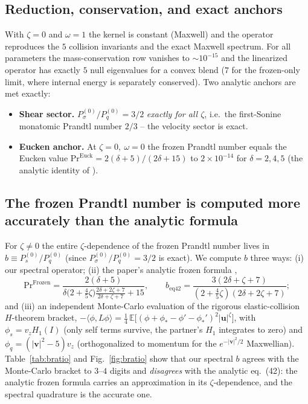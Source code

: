 \documentclass[11pt]{article}
\newcommand{\uu}{\mathbf{u}}
\newcommand{\vv}{\mathbf{v}}
\renewcommand{\Pr}{\mathrm{Pr}}
\begin{document}
\subsection{Reduction, conservation, and exact anchors}
With $\zeta=0$ and $\omega=1$ the kernel is constant (Maxwell) and the operator reproduces the
$5$ collision invariants and the exact Maxwell spectrum. For all parameters the mass-conservation
row vanishes to $\sim10^{-15}$ and the linearized operator has exactly $5$ null eigenvalues for a
convex blend ($7$ for the frozen-only limit, where internal energy is separately conserved).
Two analytic anchors are met exactly:
\begin{itemize}
\item \textbf{Shear sector.} $P_\sigma^{(0)}/P_q^{(0)}=3/2$ \emph{exactly for all $\zeta$},
i.e.\ the first-Sonine monatomic Prandtl number $2/3$ -- the velocity sector is exact.
\item \textbf{Eucken anchor.} At $\zeta=0,\ \omega=0$ the frozen Prandtl number equals the
Eucken value $\Pr^{\mathrm{Euck}}=2(\delta+5)/(2\delta+15)$ to $2\times10^{-14}$ for
$\delta=2,4,5$ (the analytic identity of \cite[eq.~(41)]{Djordjic2023}).
\end{itemize}

\subsection{The frozen Prandtl number is computed more accurately than the analytic formula}
\label{sec:frozenpr}
For $\zeta\neq0$ the entire $\zeta$-dependence of the frozen Prandtl number lives in
$b\equiv P_s^{(0)}/P_q^{(0)}$ (since $P_\sigma^{(0)}/P_q^{(0)}=3/2$ is exact). We compute $b$ three
ways: (i) our spectral operator; (ii) the paper's analytic frozen formula \cite[eq.~(42)]{Djordjic2023},
\begin{equation}
\Pr^{\mathrm{Frozen}}=\frac{2(\delta+5)}{\delta\big(2+\tfrac45\zeta\big)\frac{2\delta+2\zeta+7}{2\delta+\zeta+7}+15},
\qquad
b_{\mathrm{eq42}}=\frac{3(2\delta+\zeta+7)}{(2+\tfrac45\zeta)(2\delta+2\zeta+7)};
\end{equation}
and (iii) an independent Monte-Carlo evaluation of the rigorous elastic-collision $H$-theorem
bracket, $-\langle\phi,L\phi\rangle=\tfrac14\,\mathbb{E}\big[(\phi+\phi_*-\phi'-\phi_*')^2|\uu|^\zeta\big]$,
with $\phi_s=v_z H_1(I)$ (only self terms survive, the partner's $H_1$ integrates to zero) and
$\phi_q=(|\vv|^2-5)v_z$ (orthogonalized to momentum for the $e^{-|\vv|^2/2}$ Maxwellian).
Table~\ref{tab:bratio} and Fig.~\ref{fig:bratio} show that our spectral $b$ agrees with the
Monte-Carlo bracket to $3$--$4$ digits and \emph{disagrees} with the analytic eq.~(42): the
analytic frozen formula carries an approximation in its $\zeta$-dependence, and the spectral
quadrature is the accurate one.
\end{document}
